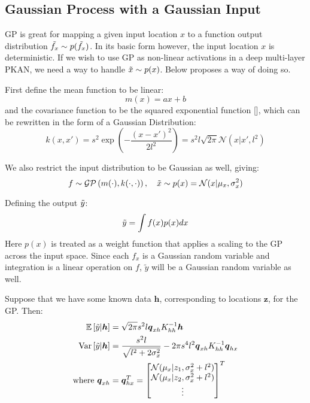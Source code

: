 \documentclass{article}
\begin{document}
\subsection{Gaussian Process with a Gaussian Input}
GP is great for mapping a given input location $x$ to a function output distribution $\Tilde{f_x}\sim p(\Tilde{f_x})$. In its basic form however, the input location $x$ is deterministic. If we wish to use GP as non-linear activations in a deep multi-layer PKAN, we need a way to handle $\Tilde{x}\sim p(x)$. Below proposes a way of doing so.

First define the mean function to be linear:
\begin{equation}
    m(x) = ax+b
    \label{eq:mean_linear}
\end{equation}
and the covariance function to be the squared exponential function [\cite[p.83]{Gaussian-Processes-for-Machine-Learning}], which can be rewritten in the form of a Gaussian Distribution:
\begin{equation}
    k(x,x')=s^2\exp\left(-\frac{(x-x')^2}{2l^2}\right)=s^2l\sqrt{2\pi}\mathcal{N}(x|x',l^2)
    \label{eq:covar_se}
\end{equation}

We also restrict the input distribution to be Gaussian as well, giving:
\begin{equation}
    f\sim\mathcal{GP}\left(m(\cdot), k(\cdot, \cdot)\right),\quad \Tilde{x}\sim p(x)=\mathcal{N}(x|\mu_x,\sigma_x^2)
\end{equation}

Defining the output $\Tilde{y}$:
\begin{equation}
    \Tilde{y}=\int f(x)p(x)dx
\end{equation}
Here $p(x)$ is treated as a weight function that applies a scaling to the GP across the input space. Since each $f_x$ is a Gaussian random variable and integration is a linear operation on $f$, $\tilde{y}$ will be a Gaussian random variable as well.

Suppose that we have some known data $\boldsymbol{h}$, corresponding to locations $\boldsymbol{z}$, for the GP. Then:
\begin{equation}
    \begin{aligned}
        \mathbb{E}\left[\Tilde{y}|\boldsymbol{h}\right]&=\sqrt{2\pi}s^2l\boldsymbol{q}_{xh}K_{hh}^{-1}\boldsymbol{h} \\
        \text{Var}\left[\Tilde{y}|\boldsymbol{h}\right]&=\frac{s^2l}{\sqrt{ l^2+2\sigma_x^2}}-2\pi s^4 l^2 \boldsymbol{q}_{xh}K_{hh}^{-1}\boldsymbol{q}_{hx} \\
        \text{where }\boldsymbol{q}_{xh}&=\boldsymbol{q}_{hx}^T=\begin{bmatrix}
            \mathcal{N}(\mu_x|z_1,\sigma_x^2+l^2) \\
            \mathcal{N}(\mu_x|z_2,\sigma_x^2+l^2) \\
            \vdots
        \end{bmatrix}^T
    \label{eq:output_gaussian}
    \end{aligned}
\end{equation}
\end{document}
